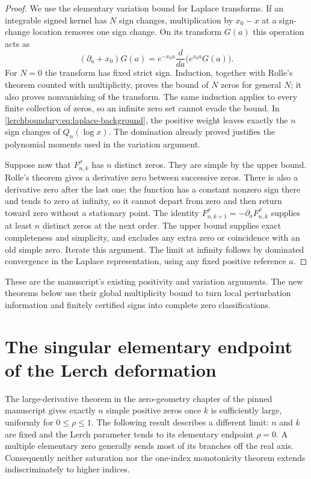 \documentclass[11pt,a4paper]{article}
\theoremstyle{definition}
\theoremstyle{remark}
\numberwithin{equation}{section}
\begin{document}
\begin{proof}
We use the elementary variation bound for Laplace transforms.
If an integrable signed kernel has $N$ sign changes, multiplication
by $x_0-x$ at a sign-change location removes one sign change.
On its transform $G(a)$ this operation acts as
\[
 (\partial_a+x_0)G(a)
 =e^{-x_0a}\frac{d}{da}\bigl(e^{x_0a}G(a)\bigr).
\]
For $N=0$ the transform has fixed strict sign. Induction, together
with Rolle's theorem counted with multiplicity, proves the bound
of $N$ zeros for general $N$; it also proves nonvanishing of the
transform. The same induction applies to every finite collection
of zeros, so an infinite zero set cannot evade the bound.
In \eqref{lerchboundary:eq:laplace-background}, the positive
weight leaves exactly the $n$ sign changes of $Q_n(\log x)$.
The domination already proved justifies the polynomial moments
used in the variation argument.

Suppose now that $F_{n,k}^{\rho}$ has $n$ distinct zeros. They are
simple by the upper bound. Rolle's theorem gives a derivative zero
between successive zeros. There is also a derivative zero after
the last one: the function has a constant nonzero sign there and
tends to zero at infinity, so it cannot depart from zero and then
return toward zero without a stationary point. The identity
$F_{n,k+1}^{\rho}=-\partial_aF_{n,k}^{\rho}$ supplies at least $n$
distinct zeros at the next order. The upper bound supplies exact
completeness and simplicity, and excludes any extra zero or
coincidence with an old simple zero. Iterate this argument.
The limit at infinity follows by dominated convergence in the
Laplace representation, using any fixed positive reference $a$.
\end{proof}

These are the manuscript's existing positivity and variation arguments.
The new theorems below use their global multiplicity bound to turn
local perturbation information and finitely certified signs into
complete zero classifications.

\section{The singular elementary endpoint of the Lerch deformation}
\label{lerchboundary:sec:zero}

The large-derivative theorem in the zero-geometry chapter of the pinned manuscript
gives exactly $n$ simple positive zeros once $k$ is sufficiently large,
uniformly for $0\leq\rho\leq1$.  The following result describes a different
limit: $n$ and $k$ are fixed and the Lerch parameter tends to its elementary
endpoint $\rho=0$.  A multiple elementary zero generally sends most of its
branches off the real axis.  Consequently neither saturation nor the
one-index monotonicity theorem extends indiscriminately to higher indices.
\end{document}
